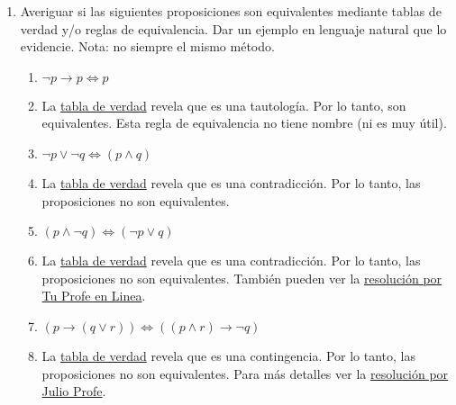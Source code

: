 \documentclass[a4paper]{article}
\newcommand{\answer}{\item[**]}
\newcommand{\exercise}{\item}
\newcommand{\then}{\to}
\newcommand{\eq}{\leftrightarrow}
\newcommand{\xor}{\veebar}
\newcommand{\Eq}{\Leftrightarrow}
\begin{document}
\begin{enumerate}[resume]
\begin{multicols}{2}
\begin{enumerate} [label=(\alph*)]
		\item $(\neg p \eq q) \land \neg (q \then \neg p)$
		\answer Es contradicción. \href{https://youtu.be/n_t1f0xa3D0?t=413}{Resolución por ProfeGuille}.

		\item $((p \land \neg q) \then \neg r) \lor (p \xor q)$
		\answer Es tautología. \href{https://youtu.be/n_t1f0xa3D0?t=643}{Resolución por ProfeGuille}.

		\item $\neg ((r \then p) \land (\neg q \lor p)) \land ( p \land (p \then r))$
		\answer Es contradicción. \href{https://youtu.be/rlJmcBGdOoY}{Resolución por ProfeGuille}.

		\item $\neg ((\neg p \land q) \then p ) \lor q$
		\answer Es contingencia. \href{https://youtu.be/n_t1f0xa3D0?t=40}{Resolución por ProfeGuille}.

	\end{enumerate}
	\end{multicols}

	\exercise Averiguar si las siguientes proposiciones son equivalentes mediante tablas de verdad y/o reglas de equivalencia.  Dar un ejemplo en lenguaje natural que lo evidencie. Nota: no siempre el mismo método.
	\begin{multicols}{2}
	\begin{enumerate} [label=(\alph*)]
		\item $\neg p\then p \Eq p$
		\answer La \href{https://www.wolframalpha.com/input?i=truth+table%3A%28not+p+%3D%3E+p%29+%3C%3D%3E+p}{tabla de verdad} revela que es una tautología. Por lo tanto, son equivalentes. Esta regla de equivalencia no tiene nombre (ni es muy útil). 

		\item $\neg p\lor \neg q \Eq (p\land q)$
		\answer La \href{https://www.wolframalpha.com/input?i=%28not+p+or+not+q%29+%3C%3D%3E+%28p+and+q%29}{tabla de verdad} revela que es una contradicción. Por lo tanto, las proposiciones no son equivalentes.

		\item $(p \land \neg q) \Eq (\neg p \lor q)$
		\answer La \href{https://www.wolframalpha.com/input?i=%28p+and+not+q%29+%3C%3D%3E+%28not+p+or+q%29}{tabla de verdad} revela que es una contradicción. Por lo tanto, las proposiciones no son equivalentes. También pueden ver la \href{https://youtu.be/NZSuHeymu4M?t=639}{resolución por Tu Profe en Linea}.

		\item $(p \then (q \lor r)) \Eq ((p \land r) \then \neg q)$
		\answer La \href{https://www.wolframalpha.com/input?i=%28p+%3D%3E+%28q+or+r%29%29+%3C%3D%3E+%28%28p+and+r%29+%3D%3E+%5Cneg+q%29}{tabla de verdad} revela que es una contingencia. Por lo tanto, las proposiciones no son equivalentes. Para más detalles ver la \href{https://www.youtube.com/live/-yHPDgU-lfE?feature=share&t=578}{resolución por Julio Profe}.


\end{enumerate}
\end{multicols}
\end{enumerate}
\end{document}

